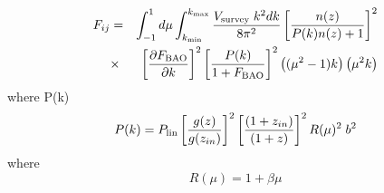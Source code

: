 \documentclass[10pt,a4paper]{article}
\begin{document}
\begin{eqnarray}
F_{ij}&=&\int_{-1}^{1}d\mu\int_{k_{\rm min}}^{k_{\rm max}}\frac{V_{\rm survey} \; k^2 dk}{8\pi^2} \left[\frac{ n(z)}{P(k)n(z)+1}\right]^2\nonumber \\
& \times & \left[\frac{\partial F_{\rm BAO}}{\partial k}\right]^2 \left[\frac{P(k)}{1+ F_{\rm BAO}}\right]^2 \left((\mu^2-1) k\right) \left(\mu^2 k \right)
\end{eqnarray}
where P(k) 
\begin{equation}
 P(k) = P_{\rm lin} \left[\frac{g(z)}{g(z_{in})}\right]^2  \left[\frac{(1+z_{in})}{(1+z)}\right]^2 R(\mu)^2  \; b^2 
\end{equation}
where
\begin{equation}
R(\mu) = 1 + \beta \mu
\end{equation}
\end{document}

